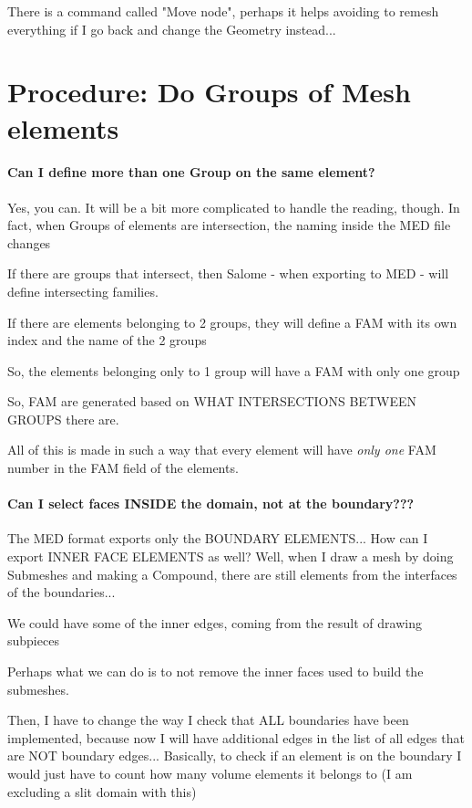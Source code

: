 \documentclass[10pt]{book}
\begin{document}
 There is a command called "Move node", perhaps it helps avoiding to remesh everything if I go back and change the Geometry instead...



  
  
  \chapter{Procedure: Do Groups of Mesh elements}
 

\subsubsection{Can I define more than one Group on the same element?}

 Yes, you can. It will be a bit more complicated to handle the reading, though.
 In fact, when Groups of elements are intersection,
 the naming inside the MED file changes
 
 If there are groups that intersect, then Salome - when exporting to MED - 
 will define intersecting families. 
 
 If there are elements belonging to 2 groups,
 they will define a FAM with its own index and the name of the 2 groups
 
 So, the elements belonging only to 1 group will have a FAM with only one group
 
 So, FAM are generated based on WHAT INTERSECTIONS BETWEEN GROUPS there are.
 
 All of this is made in such a way that every element 
 will have \textit{only one} FAM number in the FAM field of the elements.
 

\subsubsection{Can I select faces INSIDE the domain, not at the boundary???}

 The MED format exports only the BOUNDARY ELEMENTS...
 How can I export INNER FACE ELEMENTS as well?
 Well, when I draw a mesh by doing Submeshes and making a Compound,
 there are still elements from the interfaces of the boundaries...
 
 We could have some of the inner edges, coming from the result of drawing subpieces 

 Perhaps what we can do is to not remove the inner faces used to build the submeshes.
 
 Then, I have to change the way I check that ALL boundaries have been implemented,
 because now I will have additional edges in the list of all edges
 that are NOT boundary edges...
 Basically, to check if an element is on the boundary I would 
 just have to count how many volume elements it belongs to
 (I am excluding a slit domain with this)
 
\end{document}

